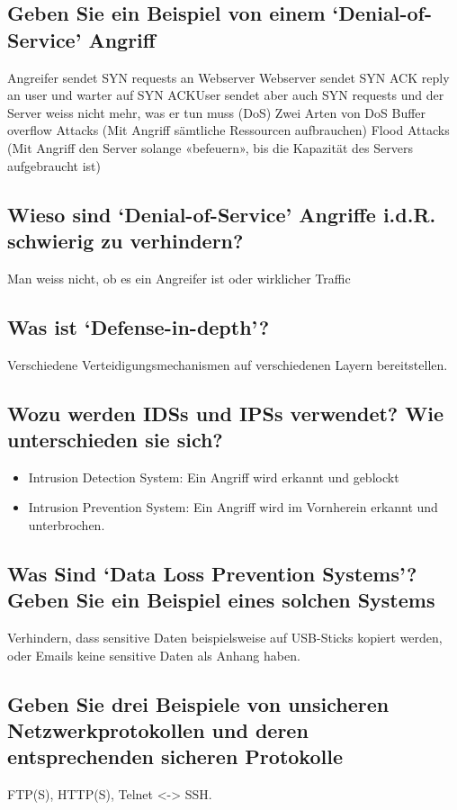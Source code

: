 \subsection*{Geben Sie ein Beispiel von einem ‘Denial-of-Service’ Angriff}
Angreifer sendet SYN requests an Webserver
Webserver sendet SYN ACK reply an user und warter auf SYN ACKUser sendet aber auch SYN requests und der Server weiss nicht mehr, was er tun muss (DoS)
Zwei Arten von DoS
Buffer overflow Attacks (Mit Angriff sämtliche Ressourcen aufbrauchen)
Flood Attacks (Mit Angriff den Server solange «befeuern», bis die Kapazität des Servers aufgebraucht ist)
\subsection*{Wieso sind ‘Denial-of-Service’ Angriffe i.d.R. schwierig zu verhindern?}
Man weiss nicht, ob es ein Angreifer ist oder wirklicher Traffic
\subsection*{Was ist ‘Defense-in-depth’?}
Verschiedene Verteidigungsmechanismen auf verschiedenen Layern bereitstellen.

\subsection*{Wozu werden IDSs und IPSs verwendet? Wie unterschieden sie sich?}
\begin{itemize}
    \item Intrusion Detection System: Ein Angriff wird erkannt und geblockt
    \item Intrusion Prevention System: Ein Angriff wird im Vornherein erkannt und unterbrochen.
\end{itemize}
\subsection*{Was Sind ‘Data Loss Prevention Systems’? Geben Sie ein Beispiel eines solchen Systems}
Verhindern, dass sensitive Daten beispielsweise auf USB-Sticks kopiert werden, oder Emails keine sensitive Daten als Anhang haben.
\subsection*{Geben Sie drei Beispiele von unsicheren Netzwerkprotokollen und deren entsprechenden sicheren Protokolle}
FTP(S), HTTP(S), Telnet <-> SSH.

